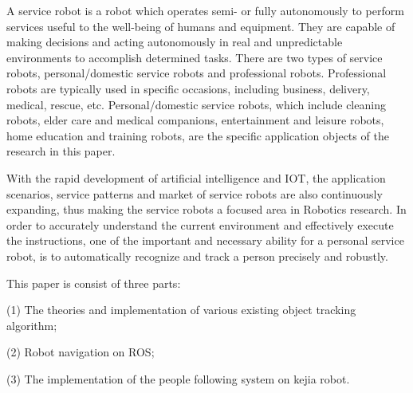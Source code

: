 \begin{enabstract}
  A service robot is a robot which operates semi- or fully autonomously to perform services useful to the well-being of humans and equipment. They are capable of making decisions and acting autonomously in real and unpredictable environments to accomplish determined tasks.  There are two types of service robots, personal/domestic service robots and professional robots. Professional robots are typically used in specific occasions, including business, delivery, medical, rescue, etc. Personal/domestic service robots, which include cleaning robots, elder care and medical companions, entertainment and leisure robots, home education and training robots, are the specific application objects of the research in this paper.

  With the rapid development of artificial intelligence and IOT, the application scenarios, service patterns and market of service robots are also continuously expanding, thus making the service robots a focused area in Robotics research. In order to accurately understand the current environment and effectively execute the instructions, one of the important and necessary ability for a personal service robot, is to automatically recognize and track a person precisely and robustly.

  This paper is consist of three parts:

  (1) The theories and implementation of various existing object tracking algorithm;

  (2) Robot navigation on ROS;

  (3) The implementation of the people following system on kejia robot.

\end{enabstract}

